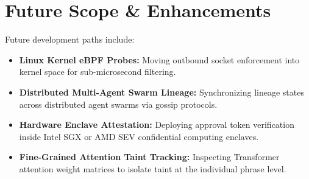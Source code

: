 \section{Future Scope \& Enhancements}
Future development paths include:
\begin{itemize}
    \item \textbf{Linux Kernel eBPF Probes:} Moving outbound socket enforcement into kernel space for sub-microsecond filtering.
    \item \textbf{Distributed Multi-Agent Swarm Lineage:} Synchronizing lineage states across distributed agent swarms via gossip protocols.
    \item \textbf{Hardware Enclave Attestation:} Deploying approval token verification inside Intel SGX or AMD SEV confidential computing enclaves.
    \item \textbf{Fine-Grained Attention Taint Tracking:} Inspecting Transformer attention weight matrices to isolate taint at the individual phrase level.
\end{itemize}

